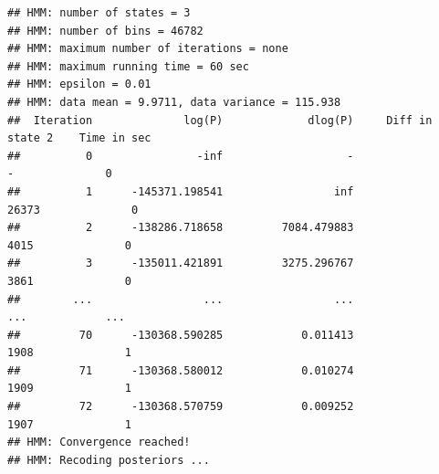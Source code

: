 \documentclass[11pt]{article}\usepackage[]{graphicx}\usepackage[]{color}
\makeatletter
\newenvironment{kframe}{%
 \def\at@end@of@kframe{}%
 \ifinner\ifhmode%
  \def\at@end@of@kframe{\end{minipage}}%
  \begin{minipage}{\columnwidth}%
 \fi\fi%
 \def\FrameCommand##1{\hskip\@totalleftmargin \hskip-\fboxsep
 \colorbox{shadecolor}{##1}\hskip-\fboxsep
     \hskip-\linewidth \hskip-\@totalleftmargin \hskip\columnwidth}%
 \MakeFramed {\advance\hsize-\width
   \@totalleftmargin\z@ \linewidth\hsize
   \@setminipage}}%
 {\par\unskip\endMakeFramed%
 \at@end@of@kframe}
\newenvironment{knitrout}{}{} %
\makeatother
\begin{document}
\begin{scriptsize}
\begin{knitrout}
\begin{kframe}
{\ttfamily\noindent\itshape\color{messagecolor}{\#\# Replaced read counts > 70 (99.9\% quantile) by 70 in 44 bins. Set option 'read.cutoff.quantile=1' to disable this filtering. This filtering was done to increase the speed of the HMM and should not affect the results.\\\#\# ------------------------------------ Try 1 of 1 -------------------------------------}}\begin{verbatim}
## HMM: number of states = 3
## HMM: number of bins = 46782
## HMM: maximum number of iterations = none
## HMM: maximum running time = 60 sec
## HMM: epsilon = 0.01
## HMM: data mean = 9.9711, data variance = 115.938
##  Iteration              log(P)             dlog(P)     Diff in state 2    Time in sec
##          0                -inf                   -                   -              0
##          1      -145371.198541                 inf               26373              0
##          2      -138286.718658         7084.479883                4015              0
##          3      -135011.421891         3275.296767                3861              0
##        ...                 ...                 ...                 ...            ...
##         70      -130368.590285            0.011413                1908              1
##         71      -130368.580012            0.010274                1909              1
##         72      -130368.570759            0.009252                1907              1
## HMM: Convergence reached!
## HMM: Recoding posteriors ...
\end{verbatim}


{\ttfamily\noindent\itshape\color{messagecolor}{\#\# Calculating states from posteriors ... 0.03s\\\#\# Making segmentation ... 0.41s}}\end{kframe}
\end{knitrout}


\end{scriptsize}
\end{document}
